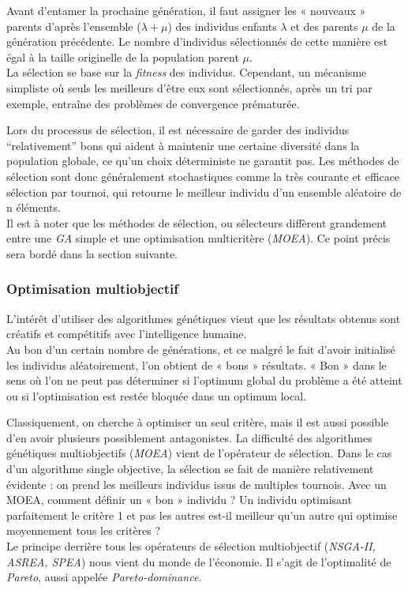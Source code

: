\documentclass[french, 11pt]{memoir}
\begin{document}
Avant d'entamer la prochaine génération, il faut assigner les « nouveaux
» parents d'après l'ensemble ($\lambda + \mu $) des individus enfants
$ \lambda $ et des parents $\mu $ de la génération précédente. Le nombre
d'individus sélectionnés de cette manière est égal à la taille
originelle de la population parent $\mu$. \\
La sélection se base sur la \emph{fitness} des individus. Cependant, un
mécanisme simpliste où seuls les meilleurs d'être eux sont sélectionnés,
après un tri par exemple, entraîne des problèmes de convergence
prématurée.

\bigskip
Lors du processus de sélection, il est nécessaire de garder des
individus ``relativement'' bons qui aident à maintenir une certaine
diversité dans la population globale, ce qu'un choix déterministe ne
garantit pas. Les méthodes de sélection sont donc généralement stochastiques comme la
très courante et efficace sélection par tournoi, qui retourne le
meilleur individu d'un ensemble aléatoire de n éléments. \\
Il est à noter que les méthodes de sélection, ou sélecteurs diffèrent
grandement entre une \emph{GA} simple et une optimisation multicritère
(\emph{MOEA}). Ce point précis sera bordé dans la section suivante.

\subsubsection{Optimisation
	multiobjectif}\label{optimisation-multiobjectif}

L'intérêt d'utiliser des algorithmes génétiques vient que les résultats
obtenus sont créatifs et compétitifs avec l'intelligence humaine.\\
Au bon
d'un certain nombre de générations, et ce malgré le fait d'avoir
initialisé les individus aléatoirement, l'on obtient de « bons »
résultats. « Bon » dans le sens où l'on ne peut pas déterminer si
l'optimum global du problème a été atteint ou si l'optimisation est
restée bloquée dans un optimum local.

\bigskip
Classiquement, on cherche à
optimiser un seul critère, mais il est aussi possible d'en avoir
plusieurs possiblement antagonistes. La difficulté des algorithmes
génétiques multiobjectifs (\emph{MOEA}) vient de l'opérateur de
sélection. Dans le cas d'un algorithme single objective, la sélection se
fait de manière relativement évidente : on prend les meilleurs individus
issus de multiples tournois. Avec un MOEA, comment définir un « bon »
individu ? Un individu optimisant parfaitement le critère 1 et pas les
autres est-il meilleur qu'un autre qui optimise moyennement tous les
critères ? \\
Le principe derrière tous les opérateurs de sélection
multiobjectif (\emph{NSGA-II, ASREA, SPEA}) nous vient du monde de
l'économie. Il s'agit de l'optimalité de \emph{Pareto}, aussi appelée
\emph{Pareto-dominance}.
\end{document}
